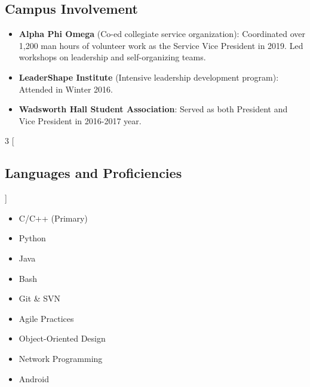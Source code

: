 \documentclass[11pt]{article}
\begin{document}
\subsection*{Campus Involvement}
\begin{itemize}
\item \textbf{Alpha Phi Omega} (Co-ed collegiate service organization):
  Coordinated over 1,200 man hours of volunteer work as the Service Vice
  President in 2019. Led workshops on leadership and self-organizing teams.
\item \textbf{LeaderShape Institute} (Intensive leadership development
  program): Attended in Winter 2016.
\item \textbf{Wadsworth Hall Student Association}: Served as both President and
  Vice President in 2016-2017 year.
\end{itemize}

\begin{multicols}{3}
  [
    \subsection*{Languages and Proficiencies}
  ]
  \begin{itemize}
    \raggedright
  \item C/C++ (Primary)
  \item Python
  \item Java
  \item Bash
  \item Git \& SVN
  \item Agile Practices
  \item Object-Oriented Design
  \item Network Programming
  \item Android
  \end{itemize}
\end{multicols}
\end{document}
